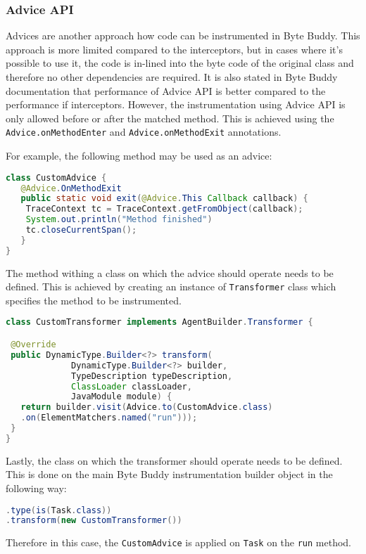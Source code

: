 \subsubsection{Advice API}
Advices are another approach how code can be instrumented in Byte Buddy. This approach is more limited compared to the interceptors, but in cases where it's possible to use it, the code is in-lined into the byte code of the original class and therefore no other dependencies are required. It is also stated in Byte Buddy documentation that performance of Advice API is better compared to the performance if interceptors.
However, the instrumentation using Advice API is only allowed before or after the matched method. This is achieved using the \texttt{Advice.onMethodEnter} and \texttt{Advice.onMethodExit} annotations. 

For example, the following method may be used as an advice: 
\begin{lstlisting}[language=Java]
class CustomAdvice {
   @Advice.OnMethodExit
   public static void exit(@Advice.This Callback callback) {
   	TraceContext tc = TraceContext.getFromObject(callback);
   	System.out.println("Method finished")
   	tc.closeCurrentSpan();
   }
}   
\end{lstlisting}

The method withing a class on which the advice should operate needs to be defined. This is achieved by creating an instance of \texttt{Transformer} class which specifies the method to be instrumented.

\begin{lstlisting}[language=Java]
class CustomTransformer implements AgentBuilder.Transformer {

 @Override
 public DynamicType.Builder<?> transform(
			 DynamicType.Builder<?> builder,
			 TypeDescription typeDescription,
			 ClassLoader classLoader,
			 JavaModule module) {
   return builder.visit(Advice.to(CustomAdvice.class)
   .on(ElementMatchers.named("run")));
 }
}
\end{lstlisting}

Lastly, the class on which the transformer should operate needs to be defined. This is done on the main Byte Buddy instrumentation builder object in the following way:

\begin{lstlisting}[language=Java]
.type(is(Task.class))
.transform(new CustomTransformer())
\end{lstlisting}

Therefore in this case, the \texttt{CustomAdvice} is applied on \texttt{Task} on the \texttt{run} method.
